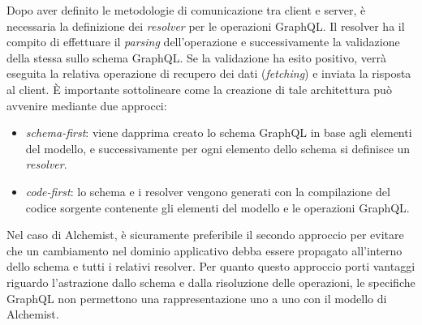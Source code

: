 Dopo aver definito le metodologie di comunicazione tra client e server, è necessaria la definizione dei \textit{resolver} per le operazioni GraphQL.
Il resolver ha il compito di effettuare il \textit{parsing} dell'operazione e successivamente la validazione della stessa sullo schema GraphQL.
Se la validazione ha esito positivo, verrà eseguita la relativa operazione di recupero dei dati (\textit{fetching}) e inviata la risposta al client.
È importante sottolineare come la creazione di tale architettura può avvenire mediante due approcci:
\begin{itemize}
    \item \textit{schema-first}: viene dapprima creato lo schema GraphQL in base agli elementi del modello, e successivamente per ogni elemento dello schema
        si definisce un \textit{resolver}.
    \item \textit{code-first}: lo schema e i resolver vengono generati con la compilazione del codice sorgente contenente gli elementi del modello
        e le operazioni GraphQL.
\end{itemize}
Nel caso di Alchemist, è sicuramente preferibile il secondo approccio per evitare che un cambiamento nel dominio applicativo debba essere propagato
all'interno dello schema e tutti i relativi resolver.
Per quanto questo approccio porti vantaggi riguardo l'astrazione dallo schema e dalla risoluzione delle operazioni, le specifiche GraphQL
non permettono una rappresentazione uno a uno con il modello di Alchemist.

